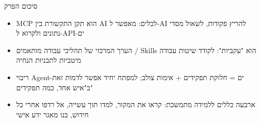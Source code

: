 \begin{tcbsummary}{סיכום הפרק}
\begin{itemize}
  \item MCP הוא תקן התקשורת בין AI לכלים: מאפשר ל-AI להריץ פקודות, לשאול מסדי נתונים ולקרוא ל-API-ים
  \item הערך המרכזי של תהליכי עבודה מותאמים / Skills הוא "עקביות": לקודד שיטות עבודה מיטביות לתבניות הנחיה
  \item ריבוי Agent-ים = חלוקת תפקידים + אימות צולב; למפתח יחיד אפשר לדמות זאת ב"איש אחד, כמה תפקידים"
  \item ארבעה כללים ללמידה מתמשכת: קראו את המקור, למדו תוך עשייה, אל רדפו אחרי כל חידוש, בנו מאגר ידע אישי
\end{itemize}

\end{tcbsummary}
